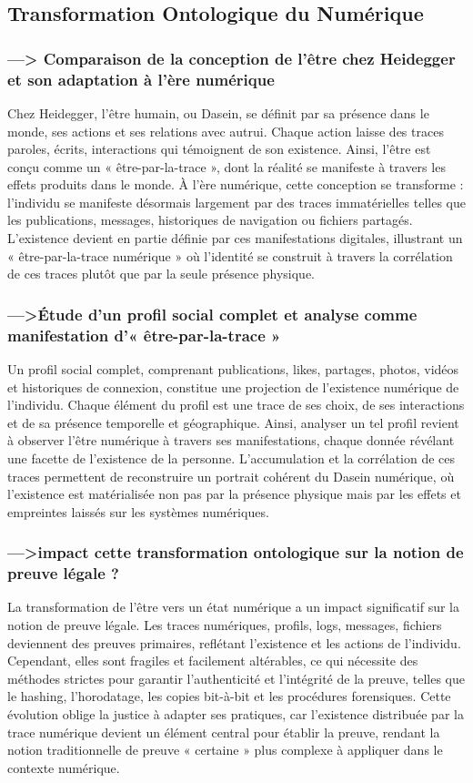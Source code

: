 \documentclass[11pt,a4paper]{article}
\begin{document}
\subsection{Transformation Ontologique du Numérique}

\subsubsection{---> Comparaison de la conception de l’être chez Heidegger et son adaptation à l’ère numérique}
Chez Heidegger, l’être humain, ou Dasein, se définit par sa présence dans le monde, ses actions et ses relations avec autrui. Chaque action laisse des traces paroles, écrits, interactions qui témoignent de son existence. Ainsi, l’être est conçu comme un « être-par-la-trace », dont la réalité se manifeste à travers les effets produits dans le monde. À l’ère numérique, cette conception se transforme : l’individu se manifeste désormais largement par des traces immatérielles telles que les publications, messages, historiques de navigation ou fichiers partagés. L’existence devient en partie définie par ces manifestations digitales, illustrant un « être-par-la-trace numérique » où l’identité se construit à travers la corrélation de ces traces plutôt que par la seule présence physique.
\subsubsection{--->Étude d'un profil social complet et analyse comme manifestation d’« être-par-la-trace »}
Un profil social complet, comprenant publications, likes, partages, photos, vidéos et historiques de connexion, constitue une projection de l’existence numérique de l’individu. Chaque élément du profil est une trace de ses choix, de ses interactions et de sa présence temporelle et géographique. Ainsi, analyser un tel profil revient à observer l’être numérique à travers ses manifestations, chaque donnée révélant une facette de l’existence de la personne. L’accumulation et la corrélation de ces traces permettent de reconstruire un portrait cohérent du Dasein numérique, où l’existence est matérialisée non pas par la présence physique mais par les effets et empreintes laissés sur les systèmes numériques.
\subsubsection{--->impact cette transformation ontologique sur la notion de preuve légale ?}
La transformation de l’être vers un état numérique a un impact significatif sur la notion de preuve légale. Les traces numériques, profils, logs, messages, fichiers deviennent des preuves primaires, reflétant l’existence et les actions de l’individu. Cependant, elles sont fragiles et facilement altérables, ce qui nécessite des méthodes strictes pour garantir l’authenticité et l’intégrité de la preuve, telles que le hashing, l’horodatage, les copies bit-à-bit et les procédures forensiques. Cette évolution oblige la justice à adapter ses pratiques, car l’existence distribuée par la trace numérique devient un élément central pour établir la preuve, rendant la notion traditionnelle de preuve « certaine » plus complexe à appliquer dans le contexte numérique.
\end{document}
